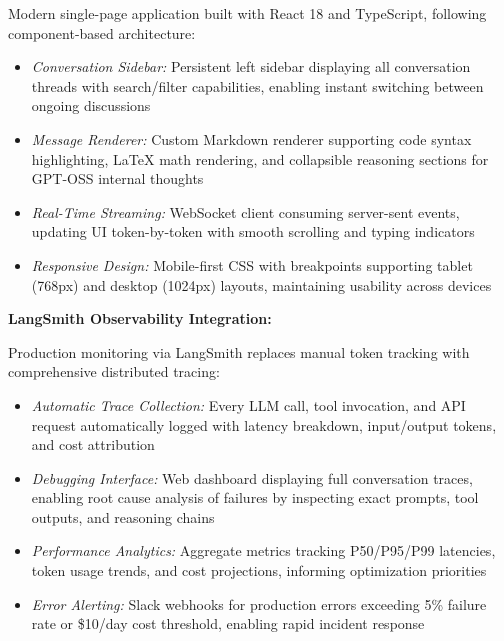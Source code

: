 \documentclass{article}
\begin{document}
Modern single-page application built with React 18 and TypeScript, following component-based architecture:

\begin{itemize}

\item \textit{Conversation Sidebar:} Persistent left sidebar displaying all conversation threads with search/filter capabilities, enabling instant switching between ongoing discussions

\item \textit{Message Renderer:} Custom Markdown renderer supporting code syntax highlighting, LaTeX math rendering, and collapsible reasoning sections for GPT-OSS internal thoughts

\item \textit{Real-Time Streaming:} WebSocket client consuming server-sent events, updating UI token-by-token with smooth scrolling and typing indicators

\item \textit{Responsive Design:} Mobile-first CSS with breakpoints supporting tablet (768px) and desktop (1024px) layouts, maintaining usability across devices

\end{itemize}

\textbf{LangSmith Observability Integration:}

Production monitoring via LangSmith \cite{langchain2024langsmith} replaces manual token tracking with comprehensive distributed tracing:

\begin{itemize}

\item \textit{Automatic Trace Collection:} Every LLM call, tool invocation, and API request automatically logged with latency breakdown, input/output tokens, and cost attribution

\item \textit{Debugging Interface:} Web dashboard displaying full conversation traces, enabling root cause analysis of failures by inspecting exact prompts, tool outputs, and reasoning chains

\item \textit{Performance Analytics:} Aggregate metrics tracking P50/P95/P99 latencies, token usage trends, and cost projections, informing optimization priorities

\item \textit{Error Alerting:} Slack webhooks for production errors exceeding 5\% failure rate or \$10/day cost threshold, enabling rapid incident response

\end{itemize}
\end{document}
